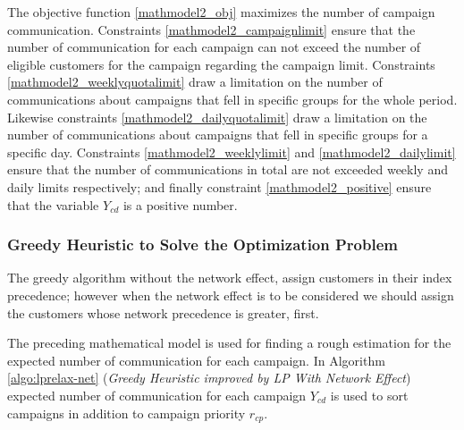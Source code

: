\documentclass[11pt]{article}
\begin{document}
The objective function \eqref{mathmodel2_obj} maximizes the number of campaign communication. Constraints \eqref{mathmodel2_campaignlimit} ensure that the number of communication for each campaign can not exceed the number of eligible customers for the campaign regarding the campaign limit. Constraints \eqref{mathmodel2_weeklyquotalimit} draw a limitation on the number of communications about campaigns that fell in specific groups for the whole period. Likewise constraints \eqref{mathmodel2_dailyquotalimit} draw a limitation on the number of communications about campaigns that fell in specific groups for a specific day. Constraints \eqref{mathmodel2_weeklylimit} and \eqref{mathmodel2_dailylimit} ensure that the number of communications in total are not exceeded weekly and daily limits respectively; and finally constraint \eqref{mathmodel2_positive} ensure that the variable $Y_{{c}{d}}$ is a positive number.\\


\subsubsection{Greedy Heuristic to Solve the Optimization Problem}\label{s:greedy-heuristic}
The greedy algorithm without the network effect, assign customers in their index precedence; however when the network effect is to be considered we should assign the customers whose network precedence is greater, first.

The preceding mathematical model is used for finding a rough estimation for the expected number of communication for each campaign. In Algorithm \ref{algo:lprelax-net} (\textit{Greedy Heuristic improved by LP With Network Effect}) expected number of communication for each campaign $Y_{{c}{d}}$ is used to sort campaigns in addition to campaign priority $r_{{c}{p}}$.
\end{document}

